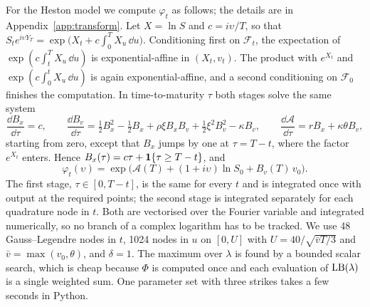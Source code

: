 For the Heston model we compute $\varphi_t$ as follows; the details are in
Appendix~\ref{app:transform}. Let $X=\ln S$ and $c=i\upsilon/T$, so that
$S_te^{i\upsilon Y_T} = \exp\bigl(X_t + c\int_0^TX_u\,\dd u\bigr)$. Conditioning first on
$\mathcal F_t$, the expectation of $\exp(c\int_t^TX_u\,\dd u)$ is exponential-affine in $(X_t,v_t)$. The
product with $e^{X_t}$ and $\exp(c\int_0^tX_u\,\dd u)$ is again exponential-affine, and a second
conditioning on $\mathcal F_0$ finishes the computation. In time-to-maturity $\tau$ both stages solve the
same system
\begin{equation}\label{eq:twostage}
\frac{\dd B_x}{\dd\tau} = c,\qquad
\frac{\dd B_v}{\dd\tau} = \tfrac12B_x^2 - \tfrac12B_x + \rho\xi B_xB_v + \tfrac12\xi^2B_v^2 - \kappa B_v,\qquad
\frac{\dd \mathcal A}{\dd\tau} = rB_x + \kappa\theta B_v ,
\end{equation}
starting from zero, except that $B_x$ jumps by one at $\tau=T-t$, where the factor $e^{X_t}$ enters.
Hence $B_x(\tau) = c\tau + \mathbf{1}\{\tau\ge T-t\}$, and
\begin{equation*}
\varphi_t(\upsilon) = \exp\bigl(\mathcal A(T) + (1+i\upsilon)\ln S_0 + B_v(T)\,v_0\bigr).
\end{equation*}
The first stage, $\tau\in[0,T-t]$, is the same for every $t$ and is integrated once with output at the
required points; the second stage is integrated separately for each quadrature node in $t$. Both are
vectorised over the Fourier variable and integrated numerically, so no branch of a complex logarithm has
to be tracked. We use 48 Gauss--Legendre nodes in $t$, 1024 nodes in $u$ on $[0,U]$ with
$U = 40/\sqrt{\bar vT/3}$ and $\bar v=\max(v_0,\theta)$, and $\delta=1$. The maximum over $\lambda$ is found by
a bounded scalar search, which is cheap because $\Phi$ is computed once and each evaluation of
$\mathrm{LB}(\lambda)$ is a single weighted sum. One parameter set with three strikes takes a few seconds in
Python.

